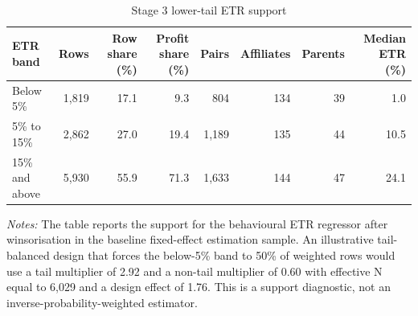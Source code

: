 \begin{table}[H]
\centering
\footnotesize
\setlength{\tabcolsep}{3pt}
\caption{Stage 3 lower-tail ETR support}
\label{tab:app_stage3_etr_tail_support}
\begin{tabular}{@{}lrrrrrrr@{}}
\toprule
ETR band & Rows & Row share (\%) & Profit share (\%) & Pairs & Affiliates & Parents & Median ETR (\%) \\
\midrule
Below 5\% & 1,819 & 17.1 &  9.3 &   804 & 134 & 39 &  1.0 \\
5\% to 15\% & 2,862 & 27.0 & 19.4 & 1,189 & 135 & 44 & 10.5 \\
15\% and above & 5,930 & 55.9 & 71.3 & 1,633 & 144 & 47 & 24.1 \\
\bottomrule
\end{tabular}

\vspace{0.35em}
\noindent\begin{minipage}{\textwidth}
\footnotesize\raggedright\textit{Notes:} The table reports the support for the behavioural ETR regressor after winsorisation in the baseline fixed-effect estimation sample. An illustrative tail-balanced design that forces the below-5\% band to 50\% of weighted rows would use a tail multiplier of 2.92 and a non-tail multiplier of 0.60 with effective N equal to 6,029 and a design effect of 1.76. This is a support diagnostic, not an inverse-probability-weighted estimator.
\end{minipage}
\end{table}
